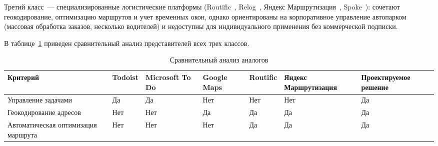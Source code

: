 Третий класс~--- специализированные логистические платформы
(Routific~\cite{routific}, Relog~\cite{relog},
Яндекс Маршрутизация~\cite{yandex_routing}, Spoke~\cite{spoke}):
сочетают геокодирование, оптимизацию маршрутов и учет временных окон,
однако ориентированы на корпоративное управление автопарком
(массовая обработка заказов, несколько водителей)
и недоступны для индивидуального применения без коммерческой подписки.

В таблице~\ref{tab:analyze_analogs} приведен сравнительный анализ
представителей всех трех классов.

\begin{table}[H]
  \caption{Сравнительный анализ аналогов}
  \label{tab:analyze_analogs}
  {\small
    \begin{tabular}{|p{2.8cm}|p{1.6cm}|p{1.7cm}|p{1.7cm}|p{1.7cm}|p{2cm}|p{2.1cm}|}
    \hline
      \multicolumn{1}{|p{2.8cm}|}{\centering Критерий}
       & \multicolumn{1}{p{1.6cm}|}{\centering Todoist}
       & \multicolumn{1}{p{1.7cm}|}{\centering Microsoft To Do}
       & \multicolumn{1}{p{1.7cm}|}{\centering Google Maps}
       & \multicolumn{1}{p{1.7cm}|}{\centering Routific}
       & \multicolumn{1}{p{2cm}|}{\centering Яндекс Марш\-рутизация}
       & \multicolumn{1}{p{2.1cm}|}{\centering Проекти\-руемое решение}                              \\ \hline
      Управление задачами
       & Да                                                                     & Да  & Нет & Нет & Нет & Да \\ \hline
      Геокодиро\-вание адресов
       & Нет                                                                    & Нет & Да  & Да  & Да  & Да \\ \hline
      Авто\-мати\-ческая оптимизация маршрута
       & Нет                                                                    & Нет & Нет & Да  & Да  & Да \\ \hline


\end{tabular}}
\end{table}
